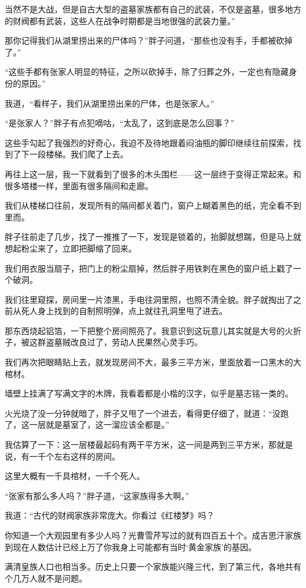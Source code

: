 当然不是大战，但是自古大型的盗墓家族都有自己的武装，不仅是盗墓，很多地方的财阀都有武装，这些人在战争时期都是当地很强的武装力量。”

那你记得我们从湖里捞出来的尸体吗？”胖子问道，“那些也没有手，手都被砍掉了。”

“这些手都有张家人明显的特征，之所以砍掉手，除了归葬之外，一定也有隐藏身份的原因。”

我道，“看样子，我们从湖里捞出来的尸体，也是张家人。”

“是张家人？”胖子有点犯嘀咕，“太乱了，这到底是怎么回事？”

这些手勾起了我强烈的好奇心，我迫不及待地跟着闷油瓶的脚印继续往前探索，找到了下一段楼梯。我们爬了上去。

再往上这一层，我一下就看到了很多的木头围栏——这一层终于变得正常起来。和很多塔楼一样，里面有很多隔间和走廊。

我们从楼梯口往前，发现所有的隔间都关着门，窗户上糊着黑色的纸，完全看不到里而。

胖子往前走了几步，找了一推推了一下，发现是锁着的，抬脚就想踹，但是马上就想起粉尘来了，立即把脚缩了回来。

我们用衣服当扇子，把门上的粉尘扇掉，然后胖子用铁刺在黑色的窗户纸上戳了一个破洞。

我们往里窥探，房间里一片漆黑，手电往洞里照，也照不清全貌。胖子就掏出了之前从死人身上找到的自制照明弹，点上就往孔洞里甩了进去。

那东西烧起铝箔，一下把整个房间照亮了。我意识到这玩意儿其实就是大号的火折子，被这群盗墓贼改良过了，劳动人民果然心灵手巧。

我们再次把眼睛贴上去，就发现房间不大，最多三平方米，里面放着一口黑木的大棺材。

墙壁上挂满了写满文字的木牌，我看着都是小楷的汉字，似乎是墓志铭一类的。

火光烧了没一分钟就暗了，胖子又甩了一个进去，看得更仔细了，就道：“没跑了，这一层就是墓室了，这一溜应该全都是。”

我估算了一下：这一层楼最起码有两干平方米，这一间是两到三平方米，那就是说，有一千个左右这样的房间。

这里大概有一千具棺材，一千个死人。

“张家有那么多人吗？”胖子道，“这家族得多大啊。”

我道：“古代的财阀家族非常庞大。你看过《红楼梦》吗？

你知道一个大观园里有多少人吗？光曹雪芹写过的就有四百五十个。成吉思汗家族到现在人数估计已经上万了你我身上可能都有当时‘黄金家族’的基因。

满清皇族人口也相当多。历史上只要一个家族能兴隆三代，到了第三代，各地共有个几万人就不是问题。

